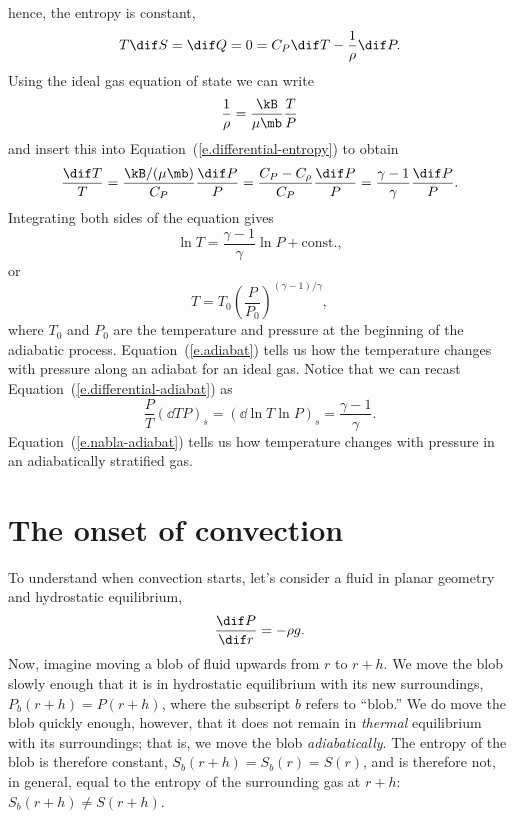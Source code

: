  hence, the entropy is constant,
\begin{equation}\label{e.differential-entropy}
    T\dif S = \dif Q = 0 = C_{P}\dif T - \frac{1}{\rho} \dif P.
\end{equation}
Using the ideal gas equation of state we can write 
\[
    \frac{1}{\rho} = \frac{\kB}{\mu\mb} \frac{T}{P}
\]
and insert this into Equation~(\ref{e.differential-entropy}) to obtain
\begin{equation}\label{e.differential-adiabat}
     \frac{\dif T}{T} = \frac{\kB/(\mu\mb)}{C_{P}}\frac{\dif P}{P} = \frac{C_{P}-C_{\rho}}{C_{P}} \frac{\dif P}{P} = \frac{\gamma-1}{\gamma}\frac{\dif P}{P}.
\end{equation}
Integrating both sides of the equation gives
\[ \ln T = \frac{\gamma-1}{\gamma}\ln P + \textrm{const.},\]
or 
\begin{equation}\label{e.adiabat}
 T = T_{0}\left(\frac{P}{P_{0}}\right)^{(\gamma-1)/\gamma},
\end{equation}
where $T_{0}$ and $P_{0}$ are the temperature and pressure at the beginning of the adiabatic process.
Equation~(\ref{e.adiabat}) tells us how the temperature changes with pressure along an adiabat for an ideal gas.  Notice that we can recast Equation~(\ref{e.differential-adiabat}) as
\begin{equation}
    \frac{P}{T}\left(\dd{T}{P}\right)_s = \left(\dd{\ln T}{\ln P}\right)_s = \frac{\gamma-1}{\gamma}.
\label{e.nabla-adiabat}
\end{equation}
Equation~(\ref{e.nabla-adiabat}) tells us how temperature changes with pressure in an adiabatically stratified gas.

\section{The onset of convection}\label{s.convection-onset}

To understand when convection starts, let's consider a fluid in planar geometry and hydrostatic equilibrium,
\begin{equation}
\frac{\dif P}{\dif r} = -\rho g.
\end{equation}
Now, imagine moving a blob of fluid upwards from $r$ to $r+h$.  We move the blob slowly enough that it is in hydrostatic equilibrium with its new surroundings, $P_{b}(r+h) = P(r+h)$, where the subscript $b$ refers to ``blob.'' We do move the blob quickly enough, however,  that it does not remain in \emph{thermal} equilibrium with its surroundings; that is, we move the blob \emph{adiabatically}.  The entropy of the blob is therefore constant, 
$S_{b}(r+h) = S_{b}(r) = S(r)$, and is therefore not, in general, equal to the entropy of the surrounding gas at $r+h$: $S_{b}(r+h)  \neq S(r+h)$.  

